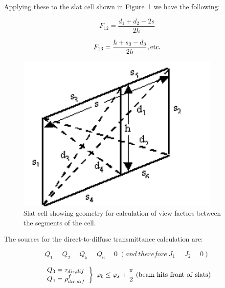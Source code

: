 Applying these to the slat cell shown in Figure~\ref{fig:slat-cell-showing-geometry-for-calculation-of} we have the following:

\begin{equation}
{F_{12}} = \frac{{{d_1} + {d_2} - 2s}}{{2h}}
\end{equation}

\begin{equation}
{F_{13}} = \frac{{h + {s_3} - {d_3}}}{{2h}}{\rm{ ,  etc}}{\rm{.}}
\end{equation}

\begin{figure}[hbtp] %
\centering
\includegraphics[width=0.9\textwidth, height=0.9\textheight, keepaspectratio=true]{media/image1063.png}
\caption{Slat cell showing geometry for calculation of view factors between the segments of the cell. \protect \label{fig:slat-cell-showing-geometry-for-calculation-of}}
\end{figure}

The sources for the direct-to-diffuse transmittance calculation are:

\begin{equation}
{Q_1} = {Q_2} = {Q_5} = {Q_6} = 0 \;  (and~therefore~{J_1} = {J_2} = 0)
\end{equation}

\begin{equation}
\left. 
    \begin{array}{l}
      Q_3 = \tau_{dir,dif} \\
      Q_4 = \rho_{dir,dif}^f 
    \end{array} 
  \right\} 
  \;
  \varphi_b \le \varphi_s + \frac{\pi }{2} 
  \;
  \rm{ (beam~hits~front~of~slats)}
\end{equation}

